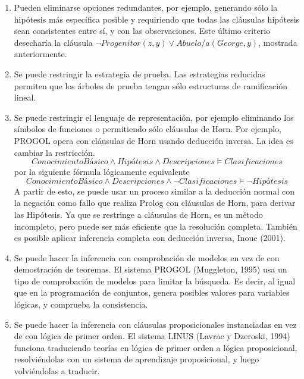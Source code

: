 \documentclass[12 pt, a4paper]{article}
\begin{document}
			\begin{enumerate}
				\item Pueden eliminarse opciones redundantes, por ejemplo, generando sólo la hipótesis más específica posible y requiriendo que todas las cláusulas hipótesis sean consistentes entre sí, y con las observaciones. Este último criterio desecharía la cláusula $\neg Progenitor(z, y) \lor Abuelo/a(George, y)$, mostrada anteriormente.\\
				\item Se puede restringir la estrategia de prueba. Las estrategias reducidas permiten que los árboles de prueba tengan sólo estructuras de ramificación lineal.\\
				\item Se puede restringir el lenguaje de representación, por ejemplo eliminando los símbolos de funciones o permitiendo sólo cláusulas de Horn. Por ejemplo, PROGOL opera con cláusulas de Horn usando deducción inversa. La idea es cambiar la restricción.\\
				
					$$\textit{ConocimientoBásico} \land \textit{Hipótesis}\land Descripciones \models Clasificaciones$$
				por la siguiente fórmula lógicamente equivalente
					$$\textit{ConocimientoBásico}\land Descripciones\land \neg Clasificaciones\models \neg \textit{Hipótesis}$$
				A partir de esto, se puede usar un proceso similar a la deducción normal con la negación como fallo que realiza Prolog con cláusulas de Horn, para derivar las Hipótesis. Ya que se restringe a cláusulas de Horn, es un método incompleto, pero puede ser más eficiente que la resolución completa. También es posible aplicar inferencia completa con deducción inversa, Inoue (2001).\\		
				\item Se puede hacer la inferencia con comprobación de modelos en vez de con demostración de teoremas. El sistema PROGOL (Muggleton, 1995) usa un tipo de comprobación de modelos para limitar la búsqueda. Es decir, al igual que en la programación de conjuntos, genera posibles valores para variables lógicas, y comprueba la consistencia.\\
				\item Se puede hacer la inferencia con cláusulas proposicionales instanciadas en vez de con lógica de primer orden. El sistema LINUS (Lavrac y Dzeroski, 1994) funciona traduciendo teorías en lógica de primer orden a lógica proposicional, resolviéndolas con un sistema de aprendizaje proposicional, y luego volviéndolas a traducir.\\
			\end{enumerate}
				
\end{document}
